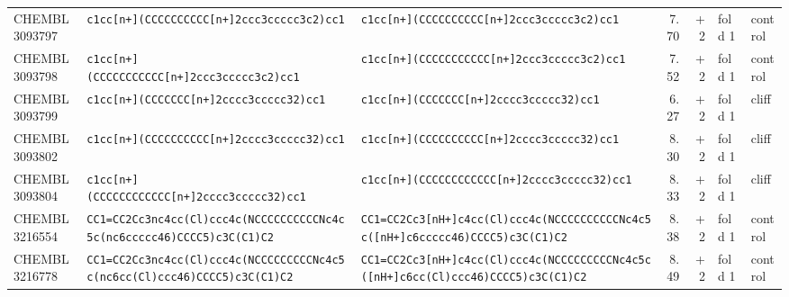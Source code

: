 \begin{longtable}{l p{4.4cm} p{4.4cm} r r l l}
CHEMBL3093797 & \texttt{c1cc[n+]\allowbreak{}(\allowbreak{}CCCCCCCCCC[n+]\allowbreak{}2ccc3ccccc3c2)\allowbreak{}cc1} & \texttt{c1cc[n+]\allowbreak{}(\allowbreak{}CCCCCCCCCC[n+]\allowbreak{}2ccc3ccccc3c2)\allowbreak{}cc1} & 7.70 & +2 & fold 1 & control \\
CHEMBL3093798 & \texttt{c1cc[n+]\allowbreak{}(\allowbreak{}CCCCCCCCCCC[n+]\allowbreak{}2ccc3ccccc3c2)\allowbreak{}cc1} & \texttt{c1cc[n+]\allowbreak{}(\allowbreak{}CCCCCCCCCCC[n+]\allowbreak{}2ccc3ccccc3c2)\allowbreak{}cc1} & 7.52 & +2 & fold 1 & control \\
CHEMBL3093799 & \texttt{c1cc[n+]\allowbreak{}(\allowbreak{}CCCCCCC[n+]\allowbreak{}2cccc3ccccc32)\allowbreak{}cc1} & \texttt{c1cc[n+]\allowbreak{}(\allowbreak{}CCCCCCC[n+]\allowbreak{}2cccc3ccccc32)\allowbreak{}cc1} & 6.27 & +2 & fold 1 & cliff \\
CHEMBL3093802 & \texttt{c1cc[n+]\allowbreak{}(\allowbreak{}CCCCCCCCCC[n+]\allowbreak{}2cccc3ccccc32)\allowbreak{}cc1} & \texttt{c1cc[n+]\allowbreak{}(\allowbreak{}CCCCCCCCCC[n+]\allowbreak{}2cccc3ccccc32)\allowbreak{}cc1} & 8.30 & +2 & fold 1 & cliff \\
CHEMBL3093804 & \texttt{c1cc[n+]\allowbreak{}(\allowbreak{}CCCCCCCCCCCC[n+]\allowbreak{}2cccc3ccccc32)\allowbreak{}cc1} & \texttt{c1cc[n+]\allowbreak{}(\allowbreak{}CCCCCCCCCCCC[n+]\allowbreak{}2cccc3ccccc32)\allowbreak{}cc1} & 8.33 & +2 & fold 1 & cliff \\
CHEMBL3216554 & \texttt{CC1=\allowbreak{}CC2Cc3nc4cc(\allowbreak{}Cl)\allowbreak{}ccc4c(\allowbreak{}NCCCCCCCCCCNc4c5c(\allowbreak{}nc6ccccc46)\allowbreak{}CCCC5)\allowbreak{}c3C(\allowbreak{}C1)\allowbreak{}C2} & \texttt{CC1=\allowbreak{}CC2Cc3[nH+]\allowbreak{}c4cc(\allowbreak{}Cl)\allowbreak{}ccc4c(\allowbreak{}NCCCCCCCCCCNc4c5c(\allowbreak{}[nH+]\allowbreak{}c6ccccc46)\allowbreak{}CCCC5)\allowbreak{}c3C(\allowbreak{}C1)\allowbreak{}C2} & 8.38 & +2 & fold 1 & control \\
CHEMBL3216778 & \texttt{CC1=\allowbreak{}CC2Cc3nc4cc(\allowbreak{}Cl)\allowbreak{}ccc4c(\allowbreak{}NCCCCCCCCCNc4c5c(\allowbreak{}nc6cc(\allowbreak{}Cl)\allowbreak{}ccc46)\allowbreak{}CCCC5)\allowbreak{}c3C(\allowbreak{}C1)\allowbreak{}C2} & \texttt{CC1=\allowbreak{}CC2Cc3[nH+]\allowbreak{}c4cc(\allowbreak{}Cl)\allowbreak{}ccc4c(\allowbreak{}NCCCCCCCCCNc4c5c(\allowbreak{}[nH+]\allowbreak{}c6cc(\allowbreak{}Cl)\allowbreak{}ccc46)\allowbreak{}CCCC5)\allowbreak{}c3C(\allowbreak{}C1)\allowbreak{}C2} & 8.49 & +2 & fold 1 & control \\

\end{longtable}
